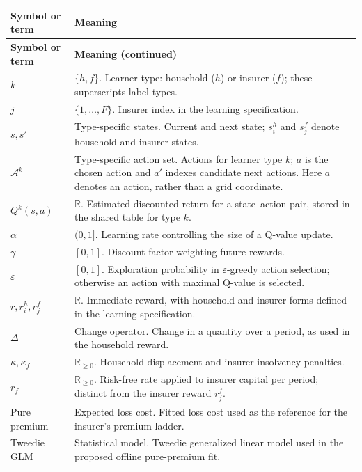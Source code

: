 \documentclass[10pt]{article}
\begin{document}
\begin{longtable}{@{}p{}>{\raggedright\arraybackslash}p{}@{}}
\toprule
\textbf{Symbol or term} & \textbf{Meaning} \\
\midrule
\endfirsthead
\toprule
\textbf{Symbol or term} & \textbf{Meaning (continued)} \\
\midrule
\endhead
\bottomrule
\endfoot
$k$ & $\{h,f\}$. Learner type: household ($h$) or insurer ($f$); these superscripts label types. \\
$j$ & $\{1,\ldots,F\}$. Insurer index in the learning specification. \\
$s,s'$ & Type-specific states. Current and next state; $s_i^h$ and $s_j^f$ denote household and insurer states. \\
$\mathcal{A}^k$ & Type-specific action set. Actions for learner type $k$; $a$ is the chosen action and $a'$ indexes candidate next actions. Here $a$ denotes an action, rather than a grid coordinate. \\
$Q^k(s,a)$ & $\mathbb{R}$. Estimated discounted return for a state--action pair, stored in the shared table for type $k$. \\
$\alpha$ & $(0,1]$. Learning rate controlling the size of a Q-value update. \\
$\gamma$ & $[0,1]$. Discount factor weighting future rewards. \\
$\varepsilon$ & $[0,1]$. Exploration probability in $\varepsilon$-greedy action selection; otherwise an action with maximal Q-value is selected. \\
$r,r_i^h,r_j^f$ & $\mathbb{R}$. Immediate reward, with household and insurer forms defined in the learning specification. \\
$\Delta$ & Change operator. Change in a quantity over a period, as used in the household reward. \\
$\kappa,\kappa_f$ & $\mathbb{R}_{\geq0}$. Household displacement and insurer insolvency penalties. \\
$r_f$ & $\mathbb{R}_{\geq0}$. Risk-free rate applied to insurer capital per period; distinct from the insurer reward $r_j^f$. \\
Pure premium & Expected loss cost. Fitted loss cost used as the reference for the insurer's premium ladder. \\
Tweedie GLM & Statistical model. Tweedie generalized linear model used in the proposed offline pure-premium fit. \\
\end{longtable}
\end{document}
